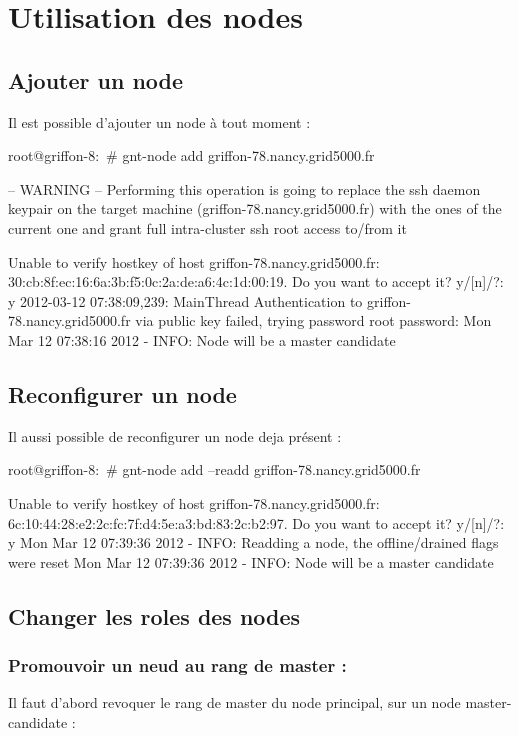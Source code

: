 \section {Utilisation des nodes}
\subsection {Ajouter un node}
Il est possible d'ajouter un node à tout moment :

root@griffon-8:~# gnt-node add griffon-78.nancy.grid5000.fr

-- WARNING -- 
Performing this operation is going to replace the ssh daemon keypair
on the target machine (griffon-78.nancy.grid5000.fr) with the ones of the current one
and grant full intra-cluster ssh root access to/from it

Unable to verify hostkey of host griffon-78.nancy.grid5000.fr:
30:cb:8f:ec:16:6a:3b:f5:0c:2a:de:a6:4c:1d:00:19. Do you want to accept
it?
y/[n]/?: y
2012-03-12 07:38:09,239: MainThread Authentication to griffon-78.nancy.grid5000.fr via public key failed, trying password
root password:
Mon Mar 12 07:38:16 2012  - INFO: Node will be a master candidate

\subsection{Reconfigurer un node}
Il aussi possible de reconfigurer un node deja présent :

root@griffon-8:~# gnt-node add --readd griffon-78.nancy.grid5000.fr

Unable to verify hostkey of host griffon-78.nancy.grid5000.fr:
6c:10:44:28:e2:2c:fc:7f:d4:5e:a3:bd:83:2c:b2:97. Do you want to accept
it?
y/[n]/?: y
Mon Mar 12 07:39:36 2012  - INFO: Readding a node, the offline/drained flags were reset
Mon Mar 12 07:39:36 2012  - INFO: Node will be a master candidate

\subsection {Changer les roles des nodes}

\subsubsection {Promouvoir un neud au rang de master :}

Il faut d'abord revoquer le rang de master du node principal, sur un node master-candidate :

